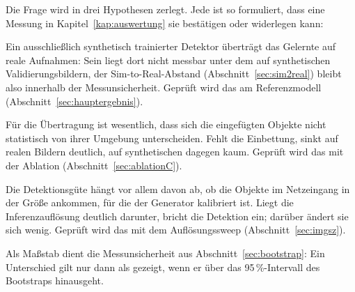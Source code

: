 Die Frage wird in drei Hypothesen zerlegt. Jede ist so formuliert, dass eine
Messung in Kapitel~\ref{kap:auswertung} sie bestätigen oder widerlegen kann:

\begin{description}[leftmargin=1.4em,itemsep=2pt,font=\normalfont\bfseries]
  \item[H1 Übertragung.] Ein ausschließlich synthetisch trainierter Detektor
  überträgt das Gelernte auf reale Aufnahmen: Sein \mAPfifty{} liegt dort
  nicht messbar unter dem auf synthetischen Validierungsbildern, der
  Sim-to-Real-Abstand (Abschnitt~\ref{sec:sim2real}) bleibt also innerhalb
  der Messunsicherheit. Geprüft wird das am Referenzmodell
  (Abschnitt~\ref{sec:hauptergebnis}).
  \item[H2 Einbettung.] Für die Übertragung ist wesentlich, dass sich die
  eingefügten Objekte nicht statistisch von ihrer Umgebung unterscheiden.
  Fehlt die Einbettung, sinkt \mAPfifty{} auf realen Bildern deutlich, auf
  synthetischen dagegen kaum. Geprüft wird das mit der Ablation
  (Abschnitt~\ref{sec:ablationC}).
  \item[H3 Objektgröße.] Die Detektionsgüte hängt vor allem davon ab, ob die
  Objekte im Netzeingang in der Größe ankommen, für die der Generator
  kalibriert ist. Liegt die Inferenzauflösung deutlich darunter, bricht die
  Detektion ein; darüber ändert sie sich wenig. Geprüft wird das mit dem
  Auflösungssweep (Abschnitt~\ref{sec:imgsz}).
\end{description}

Als Maßstab dient die Messunsicherheit aus Abschnitt~\ref{sec:bootstrap}: Ein
Unterschied gilt nur dann als gezeigt, wenn er über das 95\,\%-Intervall des
Bootstraps hinausgeht.
